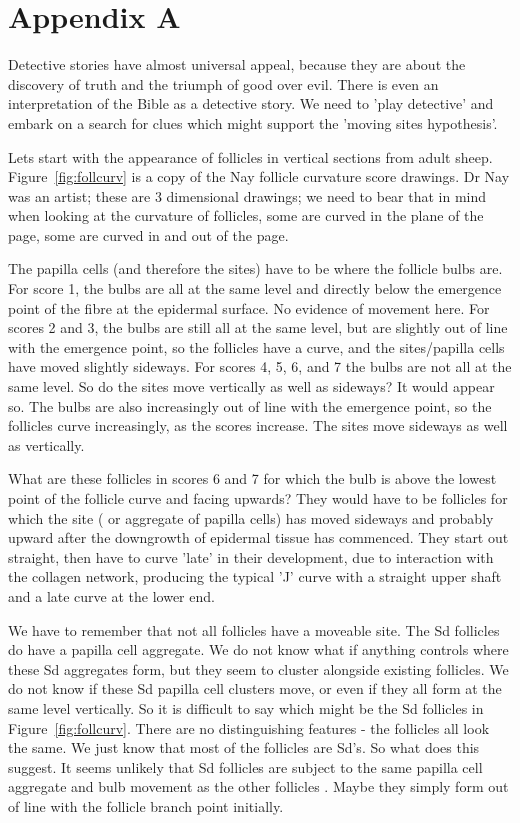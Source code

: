 \documentclass[titlepage]{article}  %
\begin{document}
\appendix
\section{Appendix A}
Detective stories have almost universal appeal, because they are about the discovery of truth and the triumph of good over evil.  There is even an interpretation of the Bible as a detective story. We need to 'play detective' and embark on a search for clues which might support the 'moving sites hypothesis'.

Lets start with the appearance of follicles in vertical sections from adult sheep. Figure~\ref{fig:follcurv} is a copy of the Nay follicle curvature score drawings. Dr Nay was an artist; these are 3 dimensional drawings; we need to bear that in mind when looking at the curvature of follicles, some are curved in the plane of the page, some are curved in and out of the page. 


The papilla cells (and therefore the sites) have to be where the follicle bulbs are. For score 1, the bulbs are all at the same level and directly below the emergence point of the fibre at the epidermal surface. No evidence of movement here. For scores 2 and 3, the bulbs are still all at the same level, but are slightly out of line with the emergence point, so the follicles have a curve, and the sites/papilla cells have moved slightly sideways. For scores 4, 5, 6, and 7 the bulbs are not all at the same level. So do the sites move vertically as well as sideways? It would appear so.  The bulbs are also increasingly out of line with the emergence point, so the follicles curve increasingly, as the scores increase. The sites move sideways as well as vertically.  

What are these follicles in scores 6 and 7 for which the bulb is above the lowest point of the follicle curve and facing upwards?  They would have to be follicles for which the site ( or aggregate of papilla cells) has moved sideways and probably upward after the downgrowth of epidermal tissue has commenced.  They start out straight, then have to curve 'late' in their development, due to interaction with the collagen network, producing the typical 'J' curve with a straight upper shaft and a late curve at the lower end.
 
We have to remember that not all follicles have a moveable site. The Sd follicles  do have a papilla cell aggregate. We do not know  what if anything controls where these Sd aggregates form, but they  seem to cluster alongside existing follicles. We do not know if these Sd papilla cell clusters move, or even if they all form at the same level vertically. So it is difficult to say which might be the Sd follicles in Figure~\ref{fig:follcurv}. There are no distinguishing features - the follicles all look the same. We just know that most of the follicles are Sd's. So what does this suggest. It seems unlikely that  Sd follicles are subject to the same papilla cell aggregate  and bulb movement as the other follicles . Maybe they simply form out of line with the follicle branch point initially. 
\end{document}
